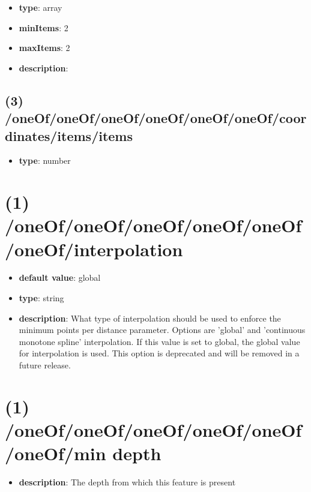 \begin{itemize}[leftmargin=2em]\item {\bf type}: array
\item {\bf minItems}: 2
\item {\bf maxItems}: 2
\item {\bf description}: 
\end{itemize}\subsection{(3) /oneOf/oneOf/oneOf/oneOf/oneOf/oneOf/coordinates/items/items}
\begin{itemize}[leftmargin=3em]\item {\bf type}: number
\end{itemize}\section{(1) /oneOf/oneOf/oneOf/oneOf/oneOf/oneOf/interpolation}
\begin{itemize}[leftmargin=1em]\item {\bf default value}: global
\item {\bf type}: string
\item {\bf description}: What type of interpolation should be used to enforce the minimum points per distance parameter. Options are 'global' and 'continuous monotone spline' interpolation. If this value is set to global, the global value for interpolation is used. This option is deprecated and will be removed in a future release.
\end{itemize}\section{(1) /oneOf/oneOf/oneOf/oneOf/oneOf/oneOf/min depth}
\begin{itemize}[leftmargin=1em]\item {\bf description}: The depth from which this feature is present
\end{itemize}
